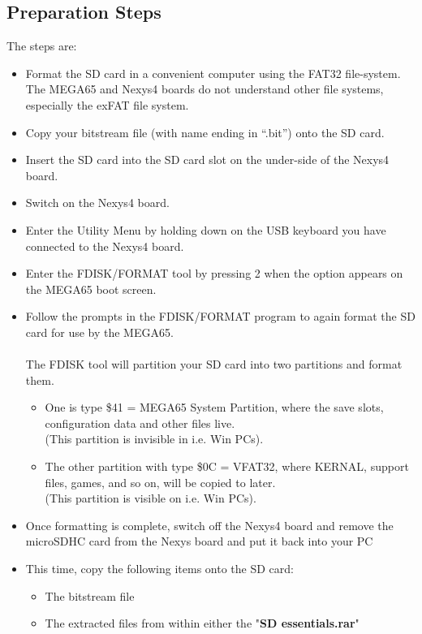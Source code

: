 \subsection{Preparation Steps}

The steps are:

\begin{itemize}
  \item{Format the SD card} in a convenient computer using the FAT32 file-system.  The MEGA65 and Nexys4 boards do not understand other
file systems, especially the exFAT file system.
\item{Copy} your bitstream file (with name ending in ``.bit'') onto the SD card.
\item{Insert} the SD card into the SD card slot on the under-side of the Nexys4 board.
\item{Switch on} the Nexys4 board.
\item{Enter the Utility Menu} by holding  down on the USB keyboard you have connected to the Nexys4 board.
\item{Enter the FDISK/FORMAT tool} by pressing 2 when the option appears on the MEGA65 boot screen.
\item{Follow the prompts} in the FDISK/FORMAT program to again format the SD card for use by the MEGA65. \\
  \\
  The FDISK tool will partition your SD card into two partitions and format them.
  \begin{itemize}
    \item One is type \$41 = MEGA65 System Partition, where the save slots, configuration data and other files live. \\
  (This partition is invisible in i.e. Win PCs).
    \item The other partition with type \$0C = VFAT32, where KERNAL, support files, games, and so on, will be copied to later. \\
  (This partition is visible on i.e. Win PCs).
  \end{itemize}
\item{Once formatting is complete}, switch off the Nexys4 board and remove the microSDHC card from the Nexys board and put it back into your PC
\item{This time, copy} the following items onto the SD card:
  \begin{itemize}
    \item The bitstream file
    \item The extracted files from within either the "\textbf{SD essentials.rar}"

\end{itemize}
\end{itemize}
